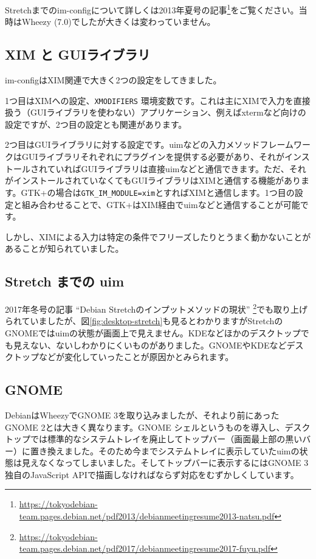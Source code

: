 \documentclass[mingoth,a4paper]{jsarticle}
\begin{document}
Stretchまでのim-configについて詳しくは2013年夏号の記事\footnote{\url{https://tokyodebian-team.pages.debian.net/pdf2013/debianmeetingresume2013-natsu.pdf}}をご覧ください。当時はWheezy (7.0)でしたが大きくは変わっていません。


\subsection{XIM と GUIライブラリ}
im-configはXIM関連で大きく2つの設定をしてきました。

1つ目はXIMへの設定、\verb|XMODIFIERS| 環境変数です。これは主にXIMで入力を直接扱う（GUIライブラリを使わない）アプリケーション、例えばxtermなど向けの設定ですが、2つ目の設定とも関連があります。

2つ目はGUIライブラリに対する設定です。uimなどの入力メソッドフレームワークはGUIライブラリそれぞれにプラグインを提供する必要があり、それがインストールされていればGUIライブラリは直接uimなどと通信できます。ただ、それがインストールされていなくてもGUIライブラリはXIMと通信する機能があります。GTK+の場合は\verb|GTK_IM_MODULE=xim|とすればXIMと通信します。1つ目の設定と組み合わせることで、GTK+はXIM経由でuimなどと通信することが可能です。

しかし、XIMによる入力は特定の条件でフリーズしたりとうまく動かないことがあることが知られていました。

\subsection{Stretch までの uim}
2017年冬号の記事 ``Debian Stretchのインプットメソッドの現状'' \footnote{\url{https://tokyodebian-team.pages.debian.net/pdf2017/debianmeetingresume2017-fuyu.pdf}}でも取り上げられていましたが、図\ref{fig:desktop-stretch}も見るとわかりますがStretchのGNOMEではuimの状態が画面上で見えません。KDEなどほかのデスクトップでも見えない、ないしわかりにくいものがありました。GNOMEやKDEなどデスクトップなどが変化していったことが原因かとみられます。

\subsection{GNOME}
DebianはWheezyでGNOME 3を取り込みましたが、それより前にあったGNOME 2とは大きく異なります。GNOME シェルというものを導入し、デスクトップでは標準的なシステムトレイを廃止してトップバー（画面最上部の黒いバー）に置き換えました。そのため今までシステムトレイに表示していたuimの状態は見えなくなってしまいました。そしてトップバーに表示するにはGNOME 3独自のJavaScript APIで描画しなければならず対応をむずかしくしています。
\end{document}
